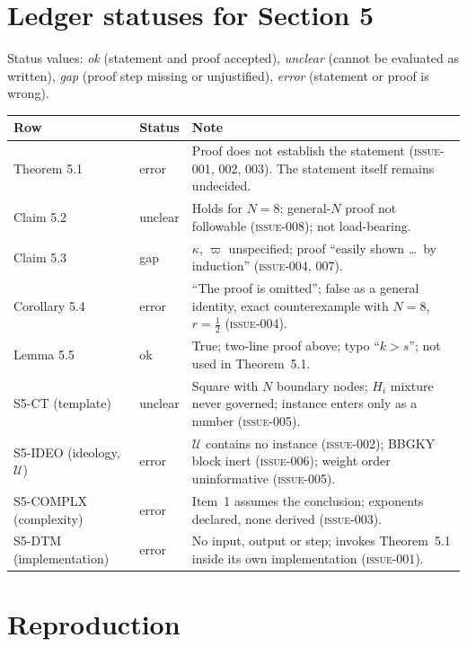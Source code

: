 \documentclass[11pt,a4paper]{article}
\newcommand{\issue}[1]{\textrm{\mdseries\textsc{issue-#1}}}
\begin{document}
\section{Ledger statuses for Section 5}

Status values: \emph{ok} (statement and proof accepted), \emph{unclear} (cannot be evaluated as written), \emph{gap} (proof step missing or unjustified), \emph{error} (statement or proof is wrong).

\begin{center}
\begin{tabular}{@{}ll>{\raggedright\arraybackslash}p{9.1cm}@{}}
\toprule
Row & Status & Note \\
\midrule
Theorem 5.1 & error & Proof does not establish the statement (\issue{001}, 002, 003). The statement itself remains undecided.\\
Claim 5.2 & unclear & Holds for $N=8$; general-$N$ proof not followable (\issue{008}); not load-bearing.\\
Claim 5.3 & gap & $\kappa$, $\varpi$ unspecified; proof ``easily shown \ldots\ by induction'' (\issue{004}, 007).\\
Corollary 5.4 & error & ``The proof is omitted''; false as a general identity, exact counterexample with $N=8$, $r=\tfrac12$ (\issue{004}).\\
Lemma 5.5 & ok & True; two-line proof above; typo ``$k>s$''; not used in Theorem~5.1.\\
S5-CT (template) & unclear & Square with $N$ boundary nodes; $H_i$ mixture never governed; instance enters only as a number (\issue{005}).\\
S5-IDEO (ideology, $\mathcal U$) & error & $\mathcal U$ contains no instance (\issue{002}); BBGKY block inert (\issue{006}); weight order uninformative (\issue{005}).\\
S5-COMPLX (complexity) & error & Item~1 assumes the conclusion; exponents declared, none derived (\issue{003}).\\
S5-DTM (implementation) & error & No input, output or step; invokes Theorem~5.1 inside its own implementation (\issue{001}).\\
\bottomrule
\end{tabular}
\end{center}

\section{Reproduction}
\end{document}
